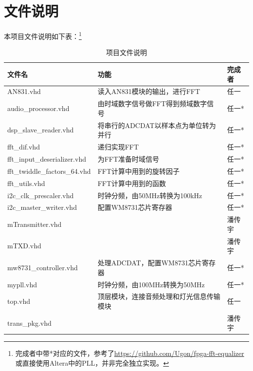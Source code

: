 \documentclass[12pt]{article}
\begin{document}
\section{文件说明}
本项目文件说明如下表：\footnote{完成者中带*对应的文件，参考了\url{https://github.com/Ugon/fpga-fft-equalizer}或直接使用Altera中的PLL，并非完全独立实现。}
\begin{table}[h]
    \begin{tabular}{|l|l|l|}
    \hline
    文件名                           & 功能                                       & 完成者 \\ \hline
    AN831.vhd                     & 读入AN831模块的输出，进行FFT                & 任一  \\ \hline
    audio\_processor.vhd          & 由时域数字信号做FFT得到频域数字信号                      & 任一*  \\ \hline
    dsp\_slave\_reader.vhd        & 将串行的ADCDAT以样本点为单位转为并行                    & 任一*  \\ \hline
    fft\_dif.vhd                  & 递归实现FFT                                  & 任一*  \\ \hline
    fft\_input\_deserializer.vhd  & 为FFT准备时域信号                               & 任一*  \\ \hline
    fft\_twiddle\_factors\_64.vhd & FFT计算中用到的旋转因子                            & 任一*  \\ \hline
    fft\_utils.vhd                & FFT计算中用到的函数                              & 任一*  \\ \hline
    i2c\_clk\_prescaler.vhd       & 时钟分频，由50MHz转换为100kHz                     & 任一* \\ \hline
    i2c\_master\_writer.vhd       & 配置WM8731芯片寄存器                            & 任一*  \\ \hline
    mTransmitter.vhd              &                                          & 潘传宇 \\ \hline
    mTXD.vhd                      &                                          & 潘传宇 \\ \hline
    mw8731\_controller.vhd        & 处理ADCDAT，配置WM8731芯片寄存器                & 任一*  \\ \hline
    mypll.vhd                     & 时钟分频，由100MHz转换为50MHz                     & 任一*  \\ \hline
    top.vhd                       & 顶层模块，连接音频处理和灯光信息传输模块 & 任一  \\ \hline
    trans\_pkg.vhd                &                                          & 潘传宇 \\ \hline
    \end{tabular}
    \caption{项目文件说明}
    \end{table}
\end{document}
